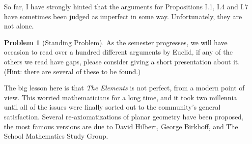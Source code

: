 \documentclass{tufte-handout}
\theoremstyle{definition}
\newtheorem{problem}{Problem}[section]
\begin{document}
So far, I have strongly hinted that the arguments for Propositions I.1, I.4 and I.7 have sometimes been judged as imperfect in some way.
Unfortunately, they are not alone.

\begin{problem}[Standing Problem]
As the semester progresses, we will have occasion to read over a hundred different arguments by Euclid, if any of the others we read have gaps, please consider giving a short presentation about it.
(Hint: there are several of these to be found.)
\end{problem}

The big lesson here is that \emph{The Elements} is not perfect, from a modern point of view.
This worried mathematicians for a long time, and it took two millennia until all of the issues were finally sorted out to the community's general satisfaction.
Several re-axiomatizations of planar geometry have been proposed, the most famous versions are due to David Hilbert, George Birkhoff, and The School Mathematics Study Group.

\vfill
\end{document}
